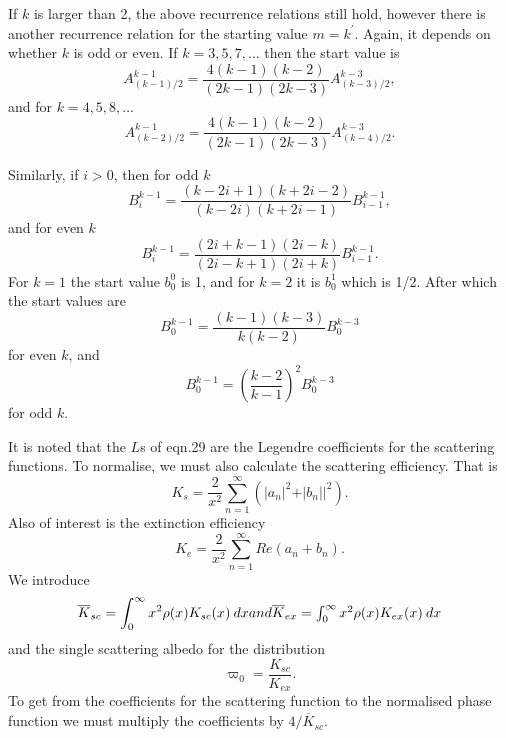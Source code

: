 If $k$ is larger than 2, the above recurrence relations still hold, however there is
another recurrence relation for the starting value $m=k^\prime$.
Again, it depends on whether $k$ is odd or even.
If $k=3,5,7,\ldots$ then the start value is
\begin{equation}
A^{k-1}_{(k-1)/2}= \frac{ 4(k-1)(k-2) }{ (2k-1)(2k-3) } A^{k-3}_{(k-3)/2},
\end{equation}
and for $k=4,5,8,\ldots$ 
\begin{equation}
A^{k-1}_{(k-2)/2}= \frac{ 4(k-1)(k-2)}{(2k-1)(2k-3)}A^{k-3}_{(k-4)/2}.
\end{equation}

Similarly, if $i>0$, then for odd $k$
\begin{equation}
B^{k-1}_i=\frac{(k-2i+1)(k+2i-2)}{(k-2i)(k+2i-1)}B^{k-1}_{i-1},
\end{equation} 
and for even $k$
\begin{equation}
B^{k-1}_i=\frac{(2i+k-1)(2i-k)}{(2i-k+1)(2i+k)}B^{k-1}_{i-1}.
\end{equation} 
For $k=1$ the start value $b^0_0$ is 1, and for $k=2$ it is $b^1_0$ which is 1/2.
After which the start values are
\begin{equation}
B^{k-1}_0= \frac{(k-1)(k-3)}{k(k-2)} B^{k-3}_0
\end{equation}
 for even $k$, and
\begin{equation}
B^{k-1}_0= \left (\frac{k-2}{k-1} \right )^2 B^{k-3}_0
\end{equation}
 for odd $k$.

It is noted that the $L$s of eqn.29 are the Legendre coefficients 
for the scattering functions.
To normalise, we must also calculate the scattering efficiency. That is
\begin{equation}
K_s=\frac{2}{x^2}\sum_{n=1}^\infty (\vert a_n \vert^2  +\vert b_n \vert|^ 2).
\end{equation}
Also of interest is the extinction efficiency
\begin{equation}
K_e=\frac{2}{x^2}\sum_{n=1}^\infty Re( a_n+b_n).
\end{equation}
We introduce
\begin{equation}
{\overline K_{sc}}=\int_0^\infty x^2 \rho(x) K_{sc}(x) \> dx
$$   and $$
{\overline K_{ex}}=\int_0^\infty x^2 \rho(x) K_{ex}(x) \> dx
\end{equation}
and the single scattering albedo for the distribution
\begin{equation}
\varpi_0=\frac{K_{sc}}{K_{ex}}.
\end{equation}
To get from the coefficients for the scattering function to the normalised phase 
function we must multiply the coefficients by $4/{\overline K_{sc}}$.

